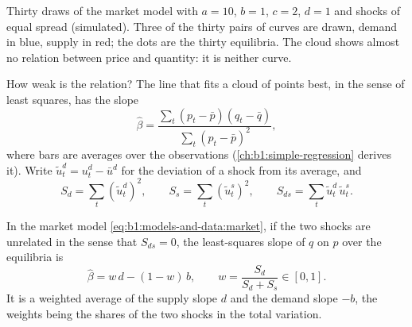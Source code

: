 \begin{omfigure}

{\small Thirty draws of the market model with $a = 10$, $b = 1$, $c = 2$,
$d = 1$ and shocks of equal spread (simulated). Three of the thirty pairs of
curves are drawn, demand in blue, supply in red; the dots are the thirty
equilibria. The cloud shows almost no relation between price and quantity:
it is neither curve.}
\end{omfigure}

How weak is the relation? The line that fits a cloud of points best, in the sense of least
squares, has the slope
\[
\hat\beta = \frac{\sum_t (p_t - \bar p)(q_t - \bar q)}{\sum_t (p_t - \bar p)^2},
\]
where bars are averages over the observations
(\cref{ch:b1:simple-regression} derives it). Write
$\tilde u^d_t = u^d_t - \bar u^d$ for the deviation of a shock from its
average, and
\[
S_d = \sum_t (\tilde u^d_t)^2, \qquad S_s = \sum_t (\tilde u^s_t)^2, \qquad
S_{ds} = \sum_t \tilde u^d_t\, \tilde u^s_t .
\]

\begin{proposition}\label{prop:b1:models-and-data:cloud}
In the market model \eqref{eq:b1:models-and-data:market}, if the two shocks
are unrelated in the sense that $S_{ds} = 0$, the least-squares slope of $q$
on $p$ over the equilibria is
\[
\hat\beta = w\,d - (1 - w)\,b, \qquad w = \frac{S_d}{S_d + S_s} \in [0, 1].
\]
It is a weighted average of the supply slope $d$ and the demand slope $-b$,
the weights being the shares of the two shocks in the total variation.
\end{proposition}

